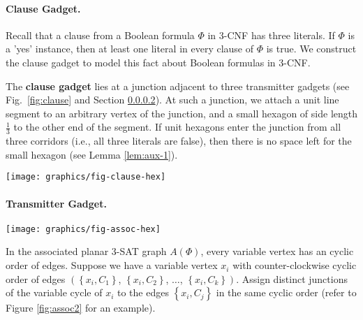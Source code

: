 \documentclass[10pt]{CSUNthesis}
\theoremstyle{plain}%
\theoremstyle{definition}
\theoremstyle{remark}
\begin{document}
\paragraph{Clause Gadget.}
Recall that a clause from a Boolean formula $\Phi$ in 3-CNF has three literals.  If $\Phi$ is a  'yes' instance, then at least one literal in every clause of $\Phi$ is true.  We construct the clause gadget to model this fact about Boolean formulas in 3-CNF.

The {\bf clause gadget} lies at a junction adjacent to three transmitter gadgets (see Fig.~\ref{fig:clause} and Section \ref{transmitterGadget}). 
At such a junction, we attach a unit line segment to an arbitrary vertex of the junction, and a small hexagon of side length $\frac{1}{3}$ to the other end of the segment. 
If unit hexagons enter the junction from all three corridors (i.e., all three literals are false), then there is no space left for the small hexagon (see Lemma \ref{lem:aux-1}).

\begin{minipage}{\linewidth}
\begin{center}
\texttt{[image: graphics/fig-clause-hex]}
\label{fig:clause}
\end{center}
\end{minipage}

\paragraph{Transmitter Gadget.\newline }\label{transmitterGadget}

\begin{minipage}{\linewidth}
\begin{center}
\texttt{[image: graphics/fig-assoc-hex]}
\label{fig:assoc2}
\end{center}
\end{minipage}

In the associated planar 3-SAT graph $A(\Phi)$, every variable vertex has an cyclic order of edges.
Suppose we have a variable vertex $x_i$ with counter-clockwise cyclic order of edges $\left(\left\lbrace x_i,C_1\right\rbrace\right.$, $\left\lbrace x_i,C_2\right\rbrace$, $\dots$, $\left.\left\lbrace x_i,C_k\right\rbrace\right) $.  
Assign distinct junctions of the variable cycle of $x_i$ to the edges $\left\lbrace x_i,C_j\right\rbrace$ in the same cyclic order (refer to Figure \ref{fig:assoc2} for an example).
\end{document}

